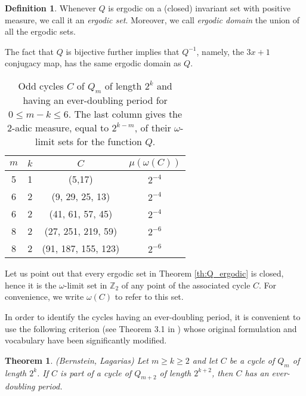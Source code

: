 \documentclass[12pt]{article}
\newtheorem{theorem}{Theorem}
\theoremstyle{definition}
\newtheorem{definition}{Definition}
\begin{document}
{\begin{definition} \label{def:ergodic}
Whenever $Q$ is ergodic on a (closed) invariant set with positive measure, we call it an {\em ergodic set}. Moreover, we call {\em ergodic domain} the union of all the ergodic sets.
\end{definition}
The fact that $Q$ is bijective further implies that $Q^{-1}$, namely, the $3x+1$ conjugacy map, has the same ergodic domain as $Q$.

\begin{table}
\caption{Odd cycles $C$ of $Q_m$ of length $2^k$ and having an ever-doubling period for $0 \leq m-k \leq 6$. The last column gives the 2-adic measure, equal to $2^{k-m}$, of their $\omega$-limit sets for the function $Q$.}
\label{tab:ergodic}
\begin{center}
\begin{tabular}{|c|c|c|c|}
\hline
$m$ & $k$ & $C$ & $\mu\left( \omega(C) \right)$  \\
\hline
\hline
5 & 1 & (5,17) & $2^{-4}$ \\
\hline
6 & 2 & (9, 29, 25, 13) & $2^{-4}$ \\
\hline
6 & 2 & (41, 61, 57, 45) & $2^{-4}$ \\
\hline
8 & 2 & (27, 251, 219, 59) & $2^{-6}$ \\
\hline
8 & 2 & (91, 187, 155, 123) & $2^{-6}$ \\
\hline
\end{tabular}
\end{center}
\end{table}

Let us point out that every ergodic set in Theorem \ref{th:Q_ergodic} is closed, hence it is the $\omega$-limit set in $\mathbb Z_{2}$ of any point of the associated cycle $C$. For convenience, we write $\omega(C)$ to refer to this set.

In order to identify the cycles having an ever-doubling period, it is convenient to use the following criterion (see Theorem 3.1 in \cite{Ber96}) whose original formulation and vocabulary have been significantly modified.

\begin{theorem} {\em (Bernstein, Lagarias)} \label{th:cycle_edp}
Let $m \geq k \geq 2$ and let $C$ be a cycle of $Q_m$ of length $2^k$. If $C$ is part of a cycle of $Q_{m+2}$ of length $2^{k+2}$, then $C$ has an ever-doubling period.
\end{theorem}

}
\end{document}
